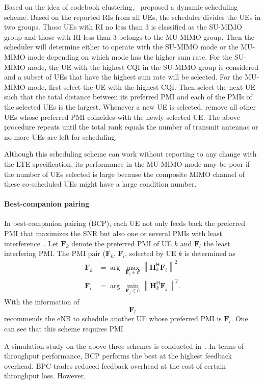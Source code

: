 \documentclass[a4paper,12pt]{article}%
\newcommand{\norm}[1]{\left\lVert#1\right\rVert} %
\begin{document}
Based on the idea of codebook clustering,~\cite{Wang2012} proposed a dynamic scheduling scheme. Based on the reported RIs from all UEs, the scheduler divides the UEs in two groups. Those UEs with RI no less than 3 is classified as the SU-MIMO group and those with RI less than 3 belongs to the MU-MIMO group. Then the scheduler will determine either to operate with the SU-MIMO mode or the MU-MIMO mode depending on which mode has the higher sum rate. For the SU-MIMO mode, the UE with the highest CQI in the SU-MIMO group is considered and a subset of UEs that have the highest sum rate will be selected.   For the MU-MIMO mode, first select the UE with the highest CQI. Then select the next UE such that the total distance between its preferred PMI and each of the PMIs of the selected UEs is the largest. Whenever a new UE is selected, remove all other UEs whose preferred PMI coincides with the newly selected UE. The above procedure repeats until the total rank equals the number of transmit antennas or no more UEs are left for scheduling.

Although this scheduling scheme can work without reporting to any change with the LTE specification, its performance in the MU-MIMO mode may be poor if the number of UEs selected is large because the composite MIMO channel of these co-scheduled UEs might have a large condition number.

\paragraph{Best-companion pairing}

In best-companion pairing (BCP), each UE not only feeds back the preferred PMI that maximizes the SNR but also one or several PMIs with least interference~\cite{bestcompanion_1}. Let $\mathbf{F}_k$ denote the preferred PMI of UE $k$ and $\mathbf{F}_l$ the least interfering PMI. The PMI pair ($\mathbf{F}_k$, $\mathbf{F}_l$, selected by UE $k$ is determined as
\begin{align}
\mathbf{F}_k &= \arg~\max_{\mathbf{F}_i \in \mathcal{C}} \norm{\mathbf{H}_k^\mathsf{H} \mathbf{F}_i}^2 \nonumber \\
\mathbf{F}_l &= \arg~\min_{\mathbf{F}_j \in \mathcal{C}} \norm{\mathbf{H}_k^\mathsf{H} \mathbf{F}_j}^2.
\end{align}
With the information of $$\mathbf{F}_l$$ recommends the eNB to schedule another UE whose preferred PMI is $\mathbf{F}_l$. One can see that this scheme requires PMI

A simulation study on the above three schemes is conducted in~\cite{Du2010}. In terms of throughput performance, BCP performs the best at the highest feedback overhead. BPC trades reduced feedback overhead at the cost of certain throughput loss. However,
\end{document}
